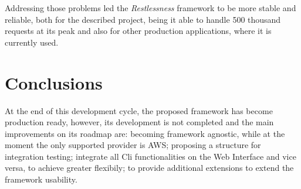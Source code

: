 \documentclass{article}
\begin{document}
\noindent
Addressing those problems led the \textit{Restlessness} framework to be more stable
and reliable, both for the described project, being it able to handle 500 thousand
requests at its peak and also for other production applications, where it is currently
used.

\section{Conclusions}
At the end of this development cycle, the proposed framework has become production
ready, however, its development is not completed and the main improvements on its
roadmap are: becoming framework agnostic, while at the moment the only supported
provider is AWS; proposing a structure for integration testing; integrate all Cli
functionalities on the Web Interface and vice versa, to achieve greater flexibily;
to provide additional extensions to extend the framework usability.
\end{document}
